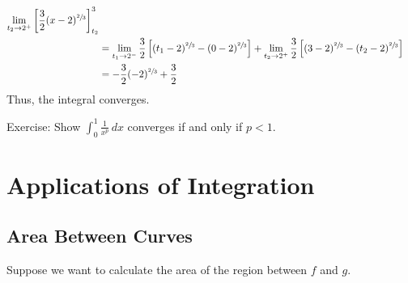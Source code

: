 \begin{Example}{}{}
\begin{enumerate}[label=(\roman*)]
\begin{align*}
                  \lim\limits_{{t_2} \to {2^+}}\left[ \frac{3}{2}(x-2)^{\sfrac{2}{3}}\right]_{t_2}^{3}                         \\
                   & =\lim\limits_{{t_1} \to {2^-}} \frac{3}{2} \left[ (t_1-2)^{\sfrac{2}{3}} -(0-2)^{\sfrac{2}{3}}\right]
                  +\lim\limits_{{t_2} \to {2^+}} \frac{3}{2} \left[ (3-2)^{\sfrac{2}{3}}-(t_2-2)^{\sfrac{2}{3}} \right]        \\
                   & =-\frac{3}{2} (-2)^{\sfrac{2}{3}}+\frac{3}{2}
              \end{align*}
              Thus, the integral converges.
    \end{enumerate}
\end{Example}

Exercise: Show $ \int_{0}^{1} \frac{1}{x^p} \, d{x}  $ converges if and only if $ p<1 $.

\chapter{Applications of Integration}
\section{Area Between Curves}
Suppose we want to calculate the area of the region between $ f $ and $ g $.

